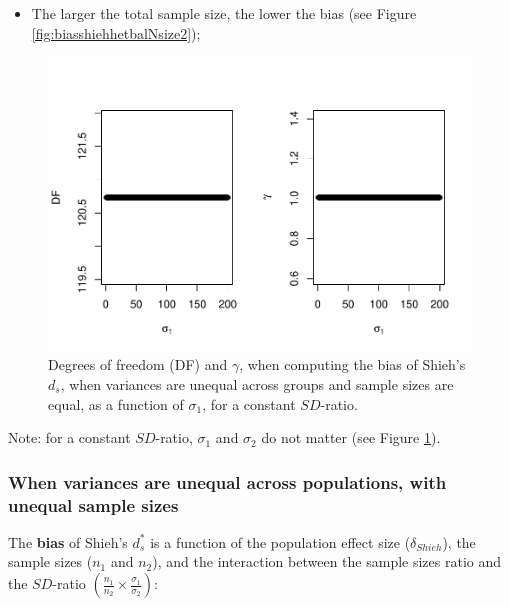 \documentclass[
  english,
  man]{apa6}
\providecommand{\tightlist}{%
  \setlength{\itemsep}{0pt}\setlength{\parskip}{0pt}}
\begin{document}
\begin{itemize}
\tightlist
\item
  The larger the total sample size, the lower the bias (see Figure \ref{fig:biasshiehhetbalNsize2});
\end{itemize}

\begin{figure}
\centering
\includegraphics{Theoretical-Bias-of-all-estimators-as-a-function-of-population-parameters_files/figure-latex/biasshiehhetbalvariance2-1.pdf}
\caption{\label{fig:biasshiehhetbalvariance2}Degrees of freedom (DF) and \(\gamma\), when computing the bias of Shieh's \(d_s\), when variances are unequal across groups and sample sizes are equal, as a function of \(\sigma_1\), for a constant \(SD\)-ratio.}
\end{figure}

Note: for a constant \(SD\)-ratio, \(\sigma_1\) and \(\sigma_2\) do not matter (see Figure \ref{fig:biasshiehhetbalvariance2}).

\hypertarget{when-variances-are-unequal-across-populations-with-unequal-sample-sizes-1}{%
\subsubsection{When variances are unequal across populations, with unequal sample sizes}\label{when-variances-are-unequal-across-populations-with-unequal-sample-sizes-1}}

The \textbf{bias} of Shieh's \(d^*_s\) is a function of the population effect size (\(\delta_{Shieh}\)), the sample sizes (\(n_1\) and \(n_2\)), and the interaction between the sample sizes ratio and the \(SD\)-ratio \(\left(\frac{n_1}{n_2}\times\frac{\sigma_1}{\sigma_2} \right)\):
\end{document}
